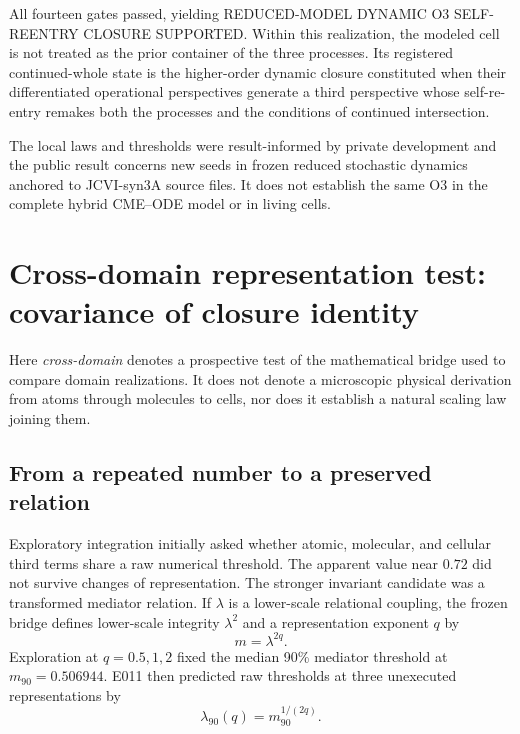 \documentclass[11pt,a4paper]{article}
\begin{document}
All fourteen gates passed, yielding \textsf{REDUCED-MODEL DYNAMIC O3 SELF-REENTRY CLOSURE SUPPORTED}. Within this realization, the modeled cell is not treated as the prior container of the three processes. Its registered continued-whole state is the higher-order dynamic closure constituted when their differentiated operational perspectives generate a third perspective whose self-re-entry remakes both the processes and the conditions of continued intersection.

The local laws and thresholds were result-informed by private development and the public result concerns new seeds in frozen reduced stochastic dynamics anchored to JCVI-syn3A source files. It does not establish the same O3 in the complete hybrid CME--ODE model or in living cells.

\section{Cross-domain representation test: covariance of closure identity}

Here \emph{cross-domain} denotes a prospective test of the mathematical bridge used to compare domain realizations. It does not denote a microscopic physical derivation from atoms through molecules to cells, nor does it establish a natural scaling law joining them.

\subsection{From a repeated number to a preserved relation}

Exploratory integration initially asked whether atomic, molecular, and cellular third terms share a raw numerical threshold. The apparent value near $0.72$ did not survive changes of representation. The stronger invariant candidate was a transformed mediator relation. If $\lambda$ is a lower-scale relational coupling, the frozen bridge defines lower-scale integrity $\lambda^2$ and a representation exponent $q$ by
\begin{equation}
 m=\lambda^{2q}.
 \label{eq:renormalized-bridge}
\end{equation}
Exploration at $q=0.5,1,2$ fixed the median 90\% mediator threshold at $m_{90}=0.506944$. E011 then predicted raw thresholds at three unexecuted representations by
\begin{equation}
 \lambda_{90}(q)=m_{90}^{1/(2q)}.
\end{equation}
\end{document}
